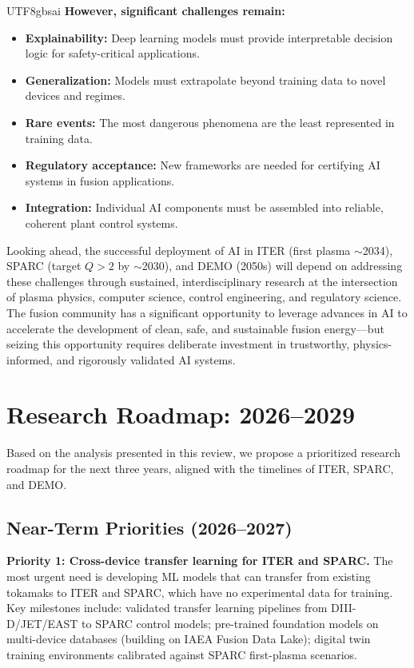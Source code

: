 \documentclass[12pt,a4paper]{article}
\begin{document}
\begin{CJK}{UTF8}{gbsai}
\textbf{However, significant challenges remain:}

\begin{itemize}
\item \textbf{Explainability:} Deep learning models must provide interpretable decision logic for safety-critical applications.
\item \textbf{Generalization:} Models must extrapolate beyond training data to novel devices and regimes.
\item \textbf{Rare events:} The most dangerous phenomena are the least represented in training data.
\item \textbf{Regulatory acceptance:} New frameworks are needed for certifying AI systems in fusion applications.
\item \textbf{Integration:} Individual AI components must be assembled into reliable, coherent plant control systems.
\end{itemize}

Looking ahead, the successful deployment of AI in ITER (first plasma $\sim$2034), SPARC (target $Q > 2$ by $\sim$2030), and DEMO (2050s) will depend on addressing these challenges through sustained, interdisciplinary research at the intersection of plasma physics, computer science, control engineering, and regulatory science. The fusion community has a significant opportunity to leverage advances in AI to accelerate the development of clean, safe, and sustainable fusion energy---but seizing this opportunity requires deliberate investment in trustworthy, physics-informed, and rigorously validated AI systems.

\section{Research Roadmap: 2026--2029}

Based on the analysis presented in this review, we propose a prioritized research roadmap for the next three years, aligned with the timelines of ITER, SPARC, and DEMO.

\subsection{Near-Term Priorities (2026--2027)}

\textbf{Priority 1: Cross-device transfer learning for ITER and SPARC.} The most urgent need is developing ML models that can transfer from existing tokamaks to ITER and SPARC, which have no experimental data for training. Key milestones include: validated transfer learning pipelines from DIII-D/JET/EAST to SPARC control models; pre-trained foundation models on multi-device databases (building on IAEA Fusion Data Lake); digital twin training environments calibrated against SPARC first-plasma scenarios.


\end{CJK}
\end{document}
